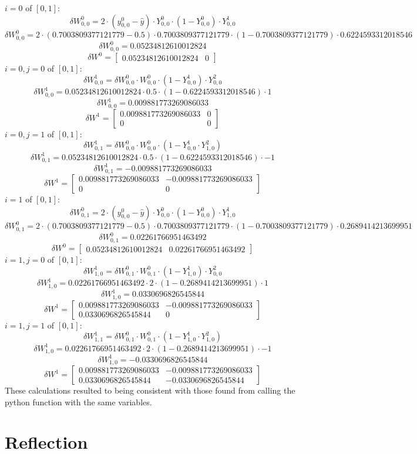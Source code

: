 \documentclass[10pt]{article}
\begin{document}
$i = 0$ of $[0,1]$:
$$\delta W^0_{0,0} = 2 \cdot (y^0_{0,0} - \hat{y} ) \cdot Y^0_{0,0} \cdot (1 - Y^0_{0,0}) \cdot Y^1_{0,0}$$
$$\delta W^0_{0,0} = 2 \cdot (0.7003809377121779 - 0.5) \cdot 0.7003809377121779 \cdot (1 - 0.7003809377121779) \cdot 0.6224593312018546$$
$$\delta W^0_{0,0} = 0.05234812610012824$$
$$\delta W^0 = \begin{bmatrix}0.05234812610012824&0\end{bmatrix}$$
$i = 0, j = 0$ of $[0,1]$:
$$\delta W^1_{0,0} = \delta W^0_{0,0} \cdot W^0_{0,0} \cdot (1 - Y^1_{0,0}) \cdot Y^2_{0,0}$$
$$\delta W^1_{0,0} = 0.05234812610012824 \cdot 0.5 \cdot (1 - 0.6224593312018546) \cdot 1$$
$$\delta W^1_{0,0} = 0.009881773269086033$$
$$\delta W^1 = \begin{bmatrix}0.009881773269086033&0\\0&0\end{bmatrix}$$
$i = 0, j = 1$ of $[0,1]$:
$$\delta W^1_{0,1} = \delta W^0_{0,0} \cdot W^0_{0,0} \cdot (1 - Y^1_{0,0} \cdot Y^2_{1,0})$$
$$\delta W^1_{0,1} = 0.05234812610012824 \cdot 0.5 \cdot (1 - 0.6224593312018546) \cdot -1$$
$$\delta W^1_{0,1} = -0.009881773269086033$$
$$\delta W^1 = \begin{bmatrix}0.009881773269086033&-0.009881773269086033\\0&0\end{bmatrix}$$
$i = 1$ of $[0,1]$:
$$\delta W^0_{0,1} = 2 \cdot (y^0_{0,0} - \hat{y} ) \cdot Y^0_{0,0} \cdot (1 - Y^0_{0,0}) \cdot Y^1_{1,0}$$
$$\delta W^0_{0,1} = 2 \cdot (0.7003809377121779 - 0.5) \cdot 0.7003809377121779 \cdot (1 - 0.7003809377121779) \cdot 0.2689414213699951$$
$$\delta W^0_{0,1} = 0.02261766951463492$$
$$\delta W^0 = \begin{bmatrix}0.05234812610012824&0.02261766951463492\end{bmatrix}$$
$i = 1, j = 0$ of $[0,1]$:
$$\delta W^1_{1,0} = \delta W^0_{0,1} \cdot W^0_{0,1} \cdot (1 - Y^1_{1,0}) \cdot Y^2_{0,0}$$
$$\delta W^1_{1,0} = 0.02261766951463492 \cdot 2 \cdot (1 - 0.2689414213699951) \cdot 1$$
$$\delta W^1_{1,0} = 0.0330696826545844$$
$$\delta W^1 = \begin{bmatrix}0.009881773269086033&-0.009881773269086033\\0.0330696826545844&0\end{bmatrix}$$
$i = 1, j = 1$ of $[0,1]$:
$$\delta W^1_{1,1} = \delta W^0_{0,1} \cdot W^0_{0,1} \cdot (1 - Y^1_{1,0} \cdot Y^2_{1,0})$$
$$\delta W^1_{1,0} = 0.02261766951463492 \cdot 2 \cdot (1 - 0.2689414213699951) \cdot -1$$
$$\delta W^1_{1,0} = -0.0330696826545844$$
$$\delta W^1 = \begin{bmatrix}0.009881773269086033&-0.009881773269086033\\0.0330696826545844&-0.0330696826545844\end{bmatrix}$$
These calculations resulted to being consistent with those found from calling the python function with the same variables.


\section{Reflection}
\end{document}
